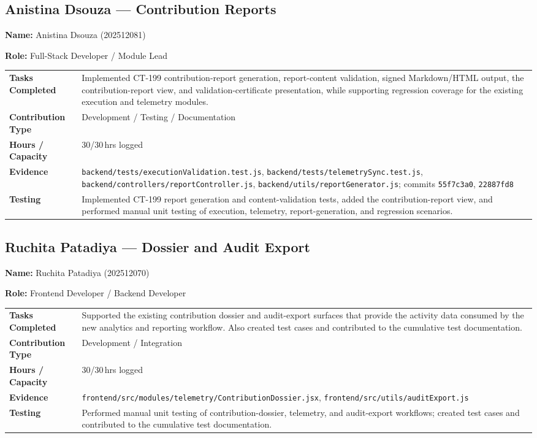 \documentclass[11pt,a4paper]{article}
\newcommand{\field}[2]{\textbf{#1:} #2\par}
\begin{document}
\subsection{Anistina Dsouza --- Contribution Reports}
\field{Name}{Anistina Dsouza (202512081)}
\field{Role}{Full-Stack Developer / Module Lead}
{\small
\begin{tabularx}{\textwidth}{>{\bfseries}p{}Y}
\toprule
Tasks Completed & Implemented CT-199 contribution-report generation, report-content validation, signed Markdown/HTML output, the contribution-report view, and validation-certificate presentation, while supporting regression coverage for the existing execution and telemetry modules. \\
Contribution Type & Development / Testing / Documentation \\
Hours / Capacity & 30/30\,hrs logged \\
Evidence & \texttt{backend/tests/executionValidation.test.js}, \texttt{backend/tests/telemetrySync.test.js}, \texttt{backend/controllers/reportController.js}, \texttt{backend/utils/reportGenerator.js}; commits \texttt{55f7c3a0}, \texttt{22887fd8} \\
Testing & Implemented CT-199 report generation and content-validation tests, added the contribution-report view, and performed manual unit testing of execution, telemetry, report-generation, and regression scenarios. \\
\bottomrule
\end{tabularx}
}

\subsection{Ruchita Patadiya --- Dossier and Audit Export}
\field{Name}{Ruchita Patadiya (202512070)}
\field{Role}{Frontend Developer / Backend Developer}
{\small
\begin{tabularx}{\textwidth}{>{\bfseries}p{}Y}
\toprule
Tasks Completed & Supported the existing contribution dossier and audit-export surfaces that provide the activity data consumed by the new analytics and reporting workflow. Also created test cases and contributed to the cumulative test documentation. \\
Contribution Type & Development / Integration \\
Hours / Capacity & 30/30\,hrs logged \\
Evidence & \texttt{frontend/src/modules/telemetry/ContributionDossier.jsx}, \texttt{frontend/src/utils/auditExport.js} \\
Testing & Performed manual unit testing of contribution-dossier, telemetry, and audit-export workflows; created test cases and contributed to the cumulative test documentation. \\
\bottomrule
\end{tabularx}
}
\end{document}
